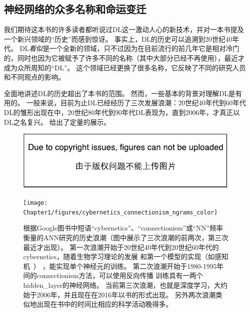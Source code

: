 \subsection{神经网络的众多名称和命运变迁}
\label{sec:the_many_names_and_changing_fortunes_of_neural_networks}

我们期待这本书的许多读者都听说过\gls{DL}这一激动人心的新技术，并对一本书提及一个新兴领域的``历史''而感到惊讶。
事实上，\gls{DL}的历史可以追溯到20世纪40年代。
\gls{DL}\emph{看似}是一个全新的领域，只不过因为在目前流行的前几年它是相对冷门的，同时也因为它被赋予了许多不同的名称（其中大部分已经不再使用），最近才成为众所周知的``\gls{DL}''。
这个领域已经更换了很多名称，它反映了不同的研究人员和不同观点的影响。

全面地讲述\gls{DL}的历史超出了本书的范围。
然而，一些基本的背景对理解\gls{DL}是有用的。
一般来说，目前为止\gls{DL}已经经历了三次发展浪潮：20世纪40年代到60年代\gls{DL}的雏形出现在中，20世纪80年代到90年代\gls{DL}表现为，直到2006年，才真正以\gls{DL}之名复兴。
给出了定量的展示。

\begin{figure}[!htb]
\ifOpenSource
\centerline{\includegraphics{figure.pdf}}
\else
\centerline{\texttt{[image: Chapter1/figures/cybernetics\_connectionism\_ngrams\_color]}}
\fi
\caption{根据Google图书中短语``\gls{cybernetics}''、``\gls{connectionism}''或``\gls{NN}''频率衡量的\gls{ANN}研究的历史浪潮（图中展示了三次浪潮的前两次，第三次最近才出现）。
第一次浪潮开始于20世纪40年代到20世纪60年代的\gls{cybernetics}，随着生物学习理论的发展\citep{McCulloch43,Hebb49}
和第一个模型的实现（如感知机~\citep{Rosenblatt-1958}） ，能实现单个神经元的训练。
第二次浪潮开始于1980-1995年间的\gls{connectionism}方法，可以使用反向传播\citep{Rumelhart86b-small} 训练具有一两个\gls{hidden_layer}的神经网络。
当前第三次浪潮，也就是深度学习，大约始于2006年\citep{Hinton06,Bengio-nips-2006-small,ranzato-07-small}，并且现在在2016年以书的形式出现。
另外两次浪潮类似地出现在书中的时间比相应的科学活动晚得多。
}
\label{fig:chap1_cybernetics_connectionism_ngrams_color}
\end{figure}

